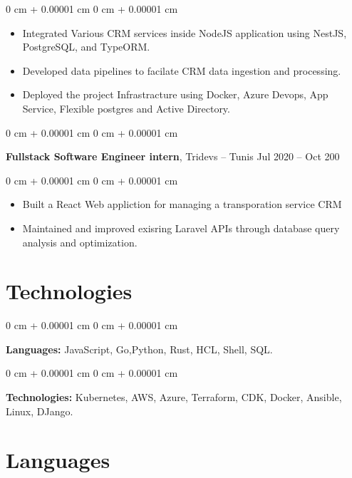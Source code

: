 \documentclass[10pt, letterpaper]{article}
\newenvironment{highlights}{ \begin{itemize}[ topsep=0.10 cm, parsep=0.10 cm, partopsep=0pt,
itemsep=0pt, leftmargin=0 cm + 10pt ] }{ \end{itemize} } %
\newenvironment{onecolentry}{ \begin{adjustwidth}{ 0 cm + 0.00001 cm }{ 0 cm + 0.00001 cm }
}{ \end{adjustwidth} } %
\newenvironment{twocolentry}[2][]{ \onecolentry \def\secondColumn{#2} \setcolumnwidth{\fill, 4.5 cm}
\begin{paracol}{2} }{ \switchcolumn \raggedleft \secondColumn \end{paracol}
\endonecolentry } %
\begin{document}
\vspace{0.10 cm}
\begin{onecolentry}
	\begin{highlights}
		\item Integrated Various CRM services inside NodeJS application using NestJS, PostgreSQL, and TypeORM.
		\item Developed data pipelines to facilate CRM data ingestion and processing.
		\item Deployed the project Infrastracture using Docker, Azure Devops, App Service, Flexible postgres and  Active Directory.
	\end{highlights}
\end{onecolentry}

\vspace{0.3 cm}
\begin{twocolentry}
	{ Jul 2020 – Oct 200 } \textbf{Fullstack Software Engineer intern}, Tridevs --
	Tunis
\end{twocolentry}

\vspace{0.10 cm}
\begin{onecolentry}
	\begin{highlights}
		\item Built a React Web appliction for managing a transporation service CRM
		\item Maintained and improved exisring Laravel APIs through database query analysis and optimization.
	\end{highlights}
\end{onecolentry}

\section{Technologies}
\begin{onecolentry}
	\textbf{Languages:} JavaScript, Go,Python, Rust, HCL, Shell, SQL.
\end{onecolentry}

\vspace{0.2 cm}

\begin{onecolentry}
	\textbf{Technologies:} Kubernetes, AWS, Azure, Terraform, CDK, Docker, Ansible, Linux, DJango.
\end{onecolentry}

\section{Languages}
\end{document}

